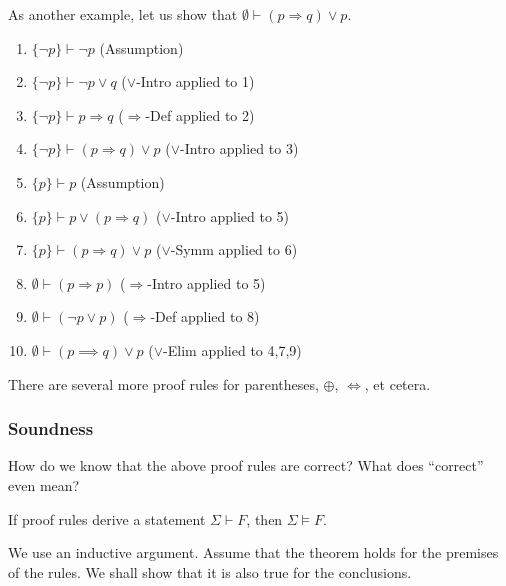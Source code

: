 As another example, let us show that $\emptyset\vdash(p\Rightarrow q)\vee p$.
\begin{enumerate}
    \item $\{\neg p\}\vdash\neg p$ \hfill (\textsf{Assumption})
    \item $\{\neg p\}\vdash \neg p \vee q$ \hfill (\textsf{$\vee$-Intro} applied to 1)
    \item $\{\neg p\}\vdash p \Rightarrow q$ \hfill (\textsf{$\Rightarrow$-Def} applied to 2)
    \item $\{\neg p\}\vdash (p \Rightarrow q)\vee p$ \hfill (\textsf{$\vee$-Intro} applied to 3)

    \item $\{p\}\vdash p$ \hfill (\textsf{Assumption})
    \item $\{p\}\vdash p\vee(p\Rightarrow q)$ \hfill (\textsf{$\vee$-Intro} applied to 5)
    \item $\{p\}\vdash (p\Rightarrow q)\vee p$ \hfill (\textsf{$\vee$-Symm} applied to 6)

    \item $\emptyset\vdash (p\Rightarrow p)$ \hfill (\textsf{$\Rightarrow$-Intro} applied to 5)
    \item $\emptyset\vdash (\neg p\vee p)$ \hfill (\textsf{$\Rightarrow$-Def} applied to 8)
    
    \item $\emptyset\vdash (p\implies q)\vee p$ \hfill (\textsf{$\vee$-Elim} applied to 4,7,9)
\end{enumerate}

There are several more proof rules for parentheses, $\oplus$, $\iff$, et cetera.

\subsubsection{Soundness}

How do we know that the above proof rules are correct? What does ``correct'' even mean?

\begin{theorem}
\label{theo: derivation implies modeling}
    If proof rules derive a statement $\Sigma\vdash F$, then $\Sigma\vDash F$.
\end{theorem}
We use an inductive argument. Assume that the theorem holds for the premises of the rules. We shall show that it is also true for the conclusions.\\

